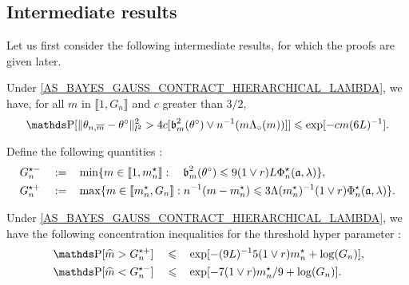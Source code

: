 \subsection{Intermediate results}
Let us first consider the following intermediate results, for which the proofs are given later.

\begin{pr}\label{prB.2.1}
Under \textsc{\cref{AS_BAYES_GAUSS_CONTRACT_HIERARCHICAL_LAMBDA}}, we have, for all $m$ in $\llbracket 1, G_{n} \rrbracket$ and $c$ greater than $3/2$,
\[\P[\Vert \theta_{n, \overline{m}} - \theta^{\circ} \Vert_{l^{2}}^{2} > 4 c [\b_{m}^{2}(\theta^{\circ}) \vee n^{-1}(m \Lambda_{\circ}(m))]] \leq \exp[-c m(6 L)^{-1}].\]
\reEnd
\end{pr}

\begin{de}\label{deB.2.1}
Define the following quantities :
\begin{alignat*}{3}
&G_{n}^{\star-} && := && \min\{m \in \llbracket 1, m_{n}^{\star} \rrbracket : \quad \operatorname{\mathfrak{b}}_{m}^{2}(\theta^{\circ}) \leqslant 9 (1 \vee r) L \Phi_{n}^{\star}(\mathfrak{a}, \lambda)\},\\
& G_{n}^{\star+} && := && \max \{m \in \llbracket m_{n}^{\star}, G_{n} \rrbracket : n^{-1}(m - m_{n}^{\star}) \leqslant 3 \Lambda(m_{n}^{\star})^{-1} (1 \vee r ) \Phi_{n}^{\star}(\mathfrak{a}, \lambda)\}.
\end{alignat*}
\assEnd
\end{de}

\begin{pr}\label{prB.2.2}
Under \textsc{\cref{AS_BAYES_GAUSS_CONTRACT_HIERARCHICAL_LAMBDA}}, we have the following concentration inequalities for the threshold hyper parameter :
\begin{alignat*}{3}
& \P[\widehat{m} > G_{n}^{\star+}] && \leq && \exp[- (9L)^{-1}5 (1 \vee r) m_{n}^{\star} + \log (G_{n})],\\
& \P[\widehat{m} < G_{n}^{\star-}] && \leq && \exp[- 7 (1 \vee r) m_{n}^{\star} / 9 + \log (G_{n})].
\end{alignat*}
\reEnd
\end{pr}

